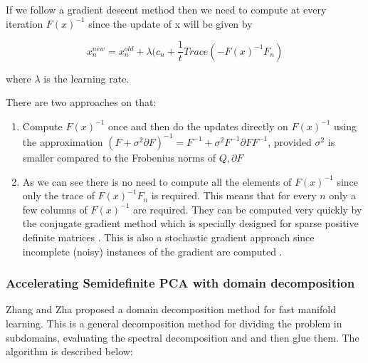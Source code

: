 \documentclass[12pt,letterpaper,doublespaced,ETD,dvips,proposal]{gtthesis}
\begin{document}
\begin{Body}
If we follow a gradient descent method then we need to compute at
every iteration $F(x)^{-1}$ since the update of x will be given by

\begin{equation}
x_{n}^{new}=x_{n}^{old}+\lambda (c_n
+\frac{1}{t}Trace(-F(x)^{-1}F_n)
\end{equation}

where $\lambda$ is the learning rate.

There are two approaches on that:
\begin{enumerate}
  \item Compute $F(x)^{-1}$ once and then do the updates directly on
  $F(x)^{-1}$ using the approximation $(F+ \sigma^2\partial F)^{-1}
  = F^{-1} + \sigma^2 F^{-1}\partial F F^{-1}$, provided $\sigma^2$
  is smaller compared to the Frobenius norms of $Q, \partial F$
  \item As we can see there is no need to compute all the elements
  of $F(x)^{-1}$ since only the trace of $F(x)^{-1}F_n$ is required.
  This means that for every $n$ only a few columns of $F(x)^{-1}$
  are required. They can be computed very quickly by the conjugate
  gradient method \cite{saad2003ims} which is specially designed for sparse positive
  definite matrices \cite{saad2003ims}. This is also a stochastic gradient approach since
  incomplete (noisy) instances of the gradient are computed \cite{spall2003iss}.
\end{enumerate}

\subsubsection{Accelerating Semidefinite PCA with domain
decomposition}

Zhang and Zha  \cite{zhang:ddm} proposed a domain decomposition method for fast
manifold learning. This is a general decomposition method for
dividing the problem in subdomains, evaluating the spectral
decomposition and and then glue them. The algorithm is described
below:

\vspace{1cm}



\end{Body}
\end{document}
